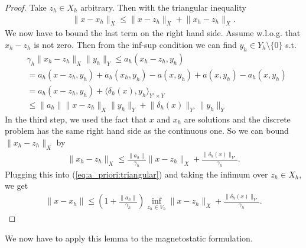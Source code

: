 \documentclass[../master_thesis.tex]{subfiles}
\begin{document}
\begin{proof}
    Take $z_h \in X_h$ arbitrary. Then with the triangular inequality
    \begin{align}
        \lVert x - x_h \rVert _X \leq \lVert x - z_h \rVert _X + \lVert x_h - z_h \rVert _X. \label{eq:a_priori:triangular}
    \end{align}
    We now have to bound the last term on the right hand side.
    Assume w.l.o.g. that $x_h - z_h$ is not zero. Then from the inf-sup condition 
    we can find $y_h \in Y_h \setminus \{0\}$ s.t. 
    \begin{align*}
        &\gamma_h \lVert x_h - z_h \rVert _X \lVert y_h \rVert _Y
        \leq a_h(x_h-z_h, y_h) 
        \\ &= a_h(x-z_h, y_h) + a_h(x_h, y_h) - a(x, y_h) + a(x, y_h) - a_h(x, y_h) 
        \\ &= a_h(x-z_h, y_h) + \langle \delta_h(x), y_h \rangle_{Y'\times Y} 
        \\ &\leq \lVert a_h \rVert \lVert x- z_h \rVert _X \lVert y_h \rVert _Y
            + \lVert \delta_h(x) \rVert _{Y'}  \lVert y_h \rVert _Y
    \end{align*}
    In the third step, we used the fact that $x$ and $x_h$ are solutions and the discrete 
    problem has the same right hand side as the continuous one.
    So we can bound $\lVert x_h - z_h \rVert _X$ by 
    \begin{align*}
        \lVert x_h - z_h \rVert _X
        \leq \frac{\lVert a_h \rVert}{\gamma_h} \lVert x- z_h \rVert _X 
            + \frac{\lVert \delta_h(x) \rVert _{Y'}}{\gamma_h}.  
    \end{align*}
    Plugging this into (\ref{eq:a_priori:triangular}) and taking the infimum 
    over $z_h \in X_h$, we get 
    \begin{align*}
        \lVert x - x_h \rVert 
        \leq \left( 1 + \frac{\lVert a_h \rVert}{\gamma_h} \right) \inf _{z_h \in V_h}\lVert x - z_h \rVert _X 
            + \frac{\lVert \delta_h(x) \rVert _{Y'}}{\gamma_h}.
    \end{align*}
\end{proof}

We now have to apply this lemma to the magnetostatic formulation.
\end{document}
